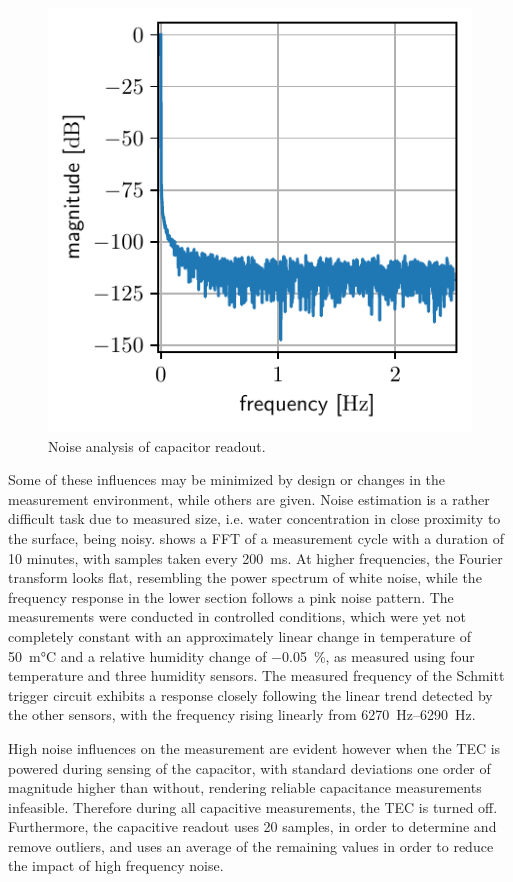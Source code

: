 \begin{figure}
    \centering
    \includegraphics{graphs/noise_cap.pdf}
    \caption{Noise analysis of capacitor readout.}
    \label{g:noise_cap}
\end{figure}
Some of these influences may be minimized by design or changes in the measurement environment, while others are given. Noise estimation is a rather difficult task due to measured size, i.e. water concentration in close proximity to the surface, being noisy.  shows a \gls{FFT} of a measurement cycle with a duration of 10 minutes, with samples taken every \qty{200}{\ms}. At higher frequencies, the Fourier transform looks flat, resembling the power spectrum of white noise, while the frequency response in the lower section follows a pink noise pattern. The measurements were conducted in controlled conditions, which were yet not completely constant with an approximately linear change in temperature of \qty[retain-explicit-plus]{+50}{\milli\celsius} and a relative humidity change of \qty[retain-explicit-plus]{-0.05}{\percent}, as measured using four temperature and three humidity sensors. The measured frequency of the Schmitt trigger circuit exhibits a response closely following the linear trend detected by the other sensors, with the frequency rising linearly from \qtyrange{6270}{6290}{\Hz}.

High noise influences on the measurement are evident however when the \gls{TEC} is powered during sensing of the capacitor, with standard deviations one order of magnitude higher than without, rendering reliable capacitance measurements infeasible. Therefore during all capacitive measurements, the \gls{TEC} is turned off. Furthermore, the capacitive readout uses 20 samples, in order to determine and remove outliers, and uses an average of the remaining values in order to reduce the impact of high frequency noise.


